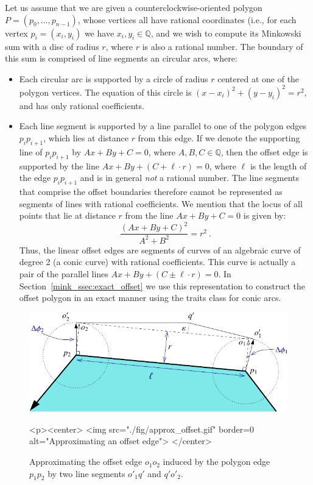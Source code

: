 Let us assume that we are given a counterclockwise-oriented polygon
$P = \left( p_0, \ldots, p_{n-1} \right)$, whose vertices all have rational
coordinates (i.e., for each vertex $p_i = (x_i, y_i)$ we have
$x_i, y_i \in {\mathbb Q}$, and we wish to compute its Minkowski sum with a
disc of radius $r$, where $r$ is also a rational number. The boundary of this
sum is comprised of line segments an circular arcs, where:
\begin{itemize}
\item
Each circular arc is supported by a circle of radius $r$ centered at one
of the polygon vertices. The equation of this circle is $(x - x_i)^2 +
(y - y_i)^2 = r^2$, and has only rational coefficients.
%
\item
Each line segment is supported by a line parallel to one of the polygon
edges $p_i p_{i+1}$, which lies at distance $r$ from this edge. If we 
denote the supporting line of $p_i p_{i+1}$ by $Ax + By + C = 0$, where
$A, B, C \in {\mathbb Q}$, then the offset edge is supported by the line
$Ax + By + (C + \ell\cdot r) = 0$, where $\ell$ is the length of the edge
$p_i p_{i+1}$ and is in general \emph{not} a rational number. The line segments
that comprise the offset boundaries therefore cannot be represented as segments
of lines with rational coefficients.
%
We mention that the locus of all points that lie at distance $r$ from the
line $Ax + By + C = 0$ is given by:
\[ \frac{(Ax + By + C)^2}{A^2 + B^2} = r^2 \ .\]
Thus, the linear offset edges are segments of curves of an algebraic curve
of degree 2 (a conic curve) with rational coefficients. This curve is
actually a pair of the parallel lines $Ax + By + (C \pm \ell\cdot r) = 0$.
In Section~\ref{mink_ssec:exact_offset} we use this representation to
construct the offset polygon in an exact manner using the traits class for
conic arcs.
\end{itemize}

\begin{figure}[t]
\begin{ccTexOnly}
  \begin{center}
  \includegraphics{Minkowski_sum_2/fig/approx_offset}
  \end{center}
\end{ccTexOnly}
\begin{ccHtmlOnly}
  <p><center>
  <img src="./fig/approx_offset.gif" border=0 alt="Approximating an offset edge">
  </center>
\end{ccHtmlOnly}
\caption{Approximating the offset edge $o_1 o_2$ induced by the polygon
edge $p_1 p_2$ by two line segments $o'_1 q'$ and $q' o'_2$.}
\label{mink_fig:approx_offset}
\end{figure}

